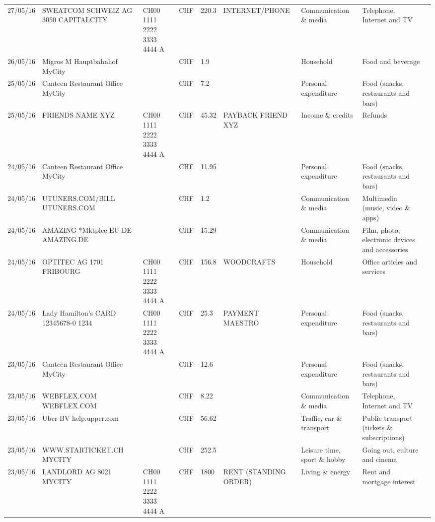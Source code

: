 \begin{landscape}
\begin{tiny}
\begin{longtable}{lp{4cm}llllp{3cm}ll}
		    27/05/16 & SWEATCOM SCHWEIZ AG 3050 CAPITALCITY & CH00 1111 2222 3333 4444 A & CHF   & 220.3 & INTERNET/PHONE & Communication \& media & Telephone,  Internet and TV \\
		    26/05/16 & Migros M Hauptbahnhof    MyCity &       & CHF   & 1.9   &       & Household & Food and beverage \\
		    25/05/16 & Canteen Restaurant Office      MyCity &       & CHF   & 7.2   &       & Personal expenditure & Food (snacks, restaurants and bars) \\
		    25/05/16 & FRIENDS NAME XYZ & CH00 1111 2222 3333 4444 A & CHF   & 45.32 & PAYBACK FRIEND XYZ & Income \& credits & Refunds \\
		    24/05/16 & Canteen Restaurant Office      MyCity &       & CHF   & 11.95 &       & Personal expenditure & Food (snacks, restaurants and bars) \\
		    24/05/16 & UTUNERS.COM/BILL          UTUNERS.COM &       & CHF   & 1.2   &       & Communication \& media & Multimedia (music, video \& apps) \\
		    24/05/16 & AMAZING *Mktplce EU-DE    AMAZING.DE &       & CHF   & 15.29 &       & Communication \& media & Film, photo, electronic devices and accessories \\
		    24/05/16 & OPTITEC AG 1701 FRIBOURG & CH00 1111 2222 3333 4444 A & CHF   & 156.8 & WOODCRAFTS & Household & Office articles and services \\
		    24/05/16 & Lady Hamilton's CARD 12345678-0 1234 & CH00 1111 2222 3333 4444 A & CHF   & 25.3  & PAYMENT MAESTRO & Personal expenditure & Food (snacks, restaurants and bars) \\
		    23/05/16 & Canteen Restaurant Office      MyCity &       & CHF   & 12.6  &       & Personal expenditure & Food (snacks, restaurants and bars) \\
		    23/05/16 & WEBFLEX.COM              WEBFLEX.COM &       & CHF   & 8.22  &       & Communication \& media & Telephone,  Internet and TV \\
		    23/05/16 & Uber BV                  help.upper.com &       & CHF   & 56.62 &       & Traffic, car \& transport & Public transport (tickets \& subscriptions) \\
		    23/05/16 & WWW.STARTICKET.CH        MYCITY &       & CHF   & 252.5 &       & Leisure time, sport \& hobby & Going out, culture and cinema \\
		    23/05/16 & LANDLORD AG 8021 MYCITY & CH00 1111 2222 3333 4444 A & CHF   & 1800  & RENT (STANDING ORDER) & Living \& energy & Rent and mortgage interest \\

\end{longtable}
\end{tiny}
\end{landscape}
